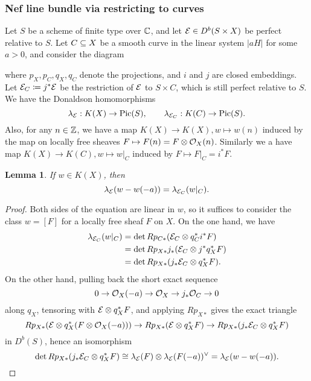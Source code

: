 \documentclass[letterpaper,11pt]{amsart}%
\newtheorem{lem}[thm]{Lemma}
\theoremstyle{remark}
\begin{document}
\subsubsection{Nef line bundle via restricting to curves}
Let $S$ be a scheme of finite type over $\mathbb{C}$, and let $\mathcal{E} \in D^b(S \times X)$ be perfect relative to $S$. Let $C \subseteq X$ be a smooth curve in the linear system $|aH|$ for some $a > 0$, and consider the diagram 
\begin{center}
\end{center}
where $p_X, p_C, q_X, q_C$ denote the projections, and $i$ and $j$ are closed embeddings. Let $\mathcal{E}_C \coloneqq j^*\mathcal{E}$ be the restriction of $\mathcal{E}$ to $S \times C$, which is still perfect relative to $S$. We have the Donaldson homomorphisms
\[ \lambda_{\mathcal{E}}: K(X) \to \mathrm{Pic}(S), \qquad \lambda_{\mathcal{E}_C}: K(C) \to \mathrm{Pic}(S). \]
Also, for any $n \in \mathbb{Z}$, we have a map $K(X) \to K(X), w \mapsto w(n)$ induced by the map on locally free sheaves $F \mapsto F(n) = F \otimes \mathcal{O}_X(n)$. Similarly we a have map $K(X) \to K(C), w \mapsto w|_C$ induced by $F \mapsto F|_C = i^*F$.
\begin{lem}
    If $w \in K(X)$, then
    \[ \lambda_{\mathcal{E}}(w - w(-a)) = \lambda_{\mathcal{E}_C}(w|_C). \]
\end{lem}
\begin{proof}
    Both sides of the equation are linear in $w$, so it suffices to consider the class $w = [F]$ for a locally free sheaf $F$ on $X$. On the one hand, we have
    \begin{align*}
        \lambda_{\mathcal{E}_C}(w|_C) & = \det R p_{C*}(\mathcal{E}_C \otimes q_C^* i^* F) \\
        & = \det R p_{X*} j_*(\mathcal{E}_C \otimes j^* q_X^* F) \\
        & = \det R p_{X*} (j_*\mathcal{E}_C \otimes q_X^* F). \\
    \end{align*}
    On the other hand, pulling back the short exact sequence 
    \[ 0 \to \mathcal{O}_X(-a) \to \mathcal{O}_X \to j_* \mathcal{O}_C \to 0 \]
    along $q_X$, tensoring with $\mathcal{E} \otimes q_X^* F$, and applying $R p_{X*}$ gives the exact triangle
    \[ R p_{X*} (\mathcal{E} \otimes q_X^*(F \otimes \mathcal{O}_X(-a))) \to R p_{X*} (\mathcal{E} \otimes q_X^*F) \to R p_{X*} (j_* \mathcal{E}_C \otimes q_X^*F) \]
    in $D^b(S)$, hence an isomorphism
    \[ \det R p_{X*} (j_* \mathcal{E}_C \otimes q_X^*F) \cong \lambda_{\mathcal{E}}(F) \otimes \lambda_{\mathcal{E}}(F(-a))^\vee = \lambda_{\mathcal{E}}(w - w(-a)). \]
\end{proof}
\end{document}
